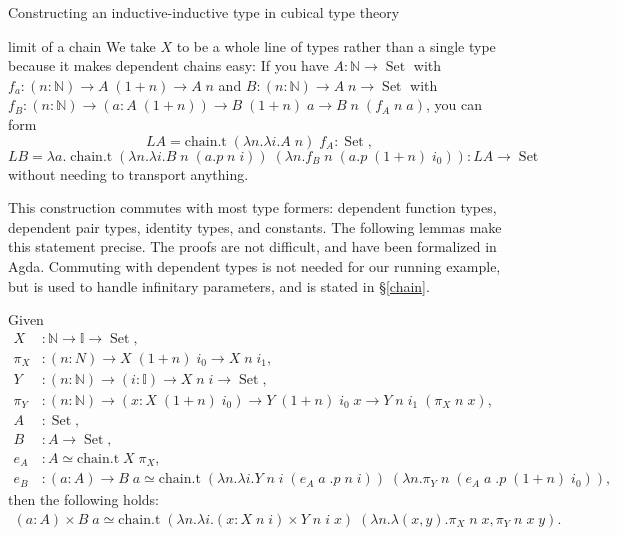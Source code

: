 \documentclass[acmsmall,review]{acmart}\settopmatter{printfolios=true,printccs=false,printacmref=false}
\DeclareMathOperator{\USet}{Set}
\newcommand{\N}{\mathbb{N}}
\newcommand{\I}{\mathbb{I}}
\begin{document}
\begin{section}{Constructing an inductive-inductive type in cubical type theory}
\begin{subsection}{limit of a chain}
We take $X$ to be a whole line of types rather than a single type because it makes dependent chains easy: If you have $A : \N\to \USet$ with $f_a : (n : \N) \to A\;(1+n) \to A\;n$ and $B : (n : \N) \to A\;n \to \USet$ with $f_B : (n : \N) \to (a : A\;(1+n)) \to B\;(1+n)\;a \to B\;n\;(f_A\;n\;a)$, you can form \[LA = \text{chain.t}\;(\lambda n.\lambda i. A\;n)\;f_A : \USet,\]\[LB = \lambda a.\;\text{chain.t}\;(\lambda n.\lambda i. B\;n\;(a.p\;n\;i))\;(\lambda n. f_B\;n\;(a.p\;(1+n)\;i_0)) : LA \to \USet\] without needing to transport anything.

This construction commutes with most type formers: dependent function types, dependent pair types, identity types, and constants. The following lemmas make this statement precise. The proofs are not difficult, and have been formalized in Agda. Commuting with dependent types is not needed for our running example, but is used to handle infinitary parameters, and is stated in \S\ref{chain}.

\begin{lemma}
    Given \begin{align*}
    X &: \N \to \I \to \USet,\\
    \pi_X &: (n : N) \to X\;(1+n)\;i_0 \to X\;n\;i_1,\\
    Y &: (n : \N) \to (i : \I) \to X\;n\;i \to \USet,\\
    \pi_Y &: (n : \N) \to (x : X\;(1+n)\;i_0) \to Y\;(1+n)\;i_0\;x \to Y\;n\;i_1\;(\pi_X\;n\;x),\\
    A &: \USet,\\
    B &: A \to \USet,\\
    e_A &: A \simeq \text{chain.t}\;X\;\pi_X,\\
    e_B &: (a : A) \to B\;a \simeq \text{chain.t}\;(\lambda n.\lambda i.Y\;n\;i\;(e_A\;a\;.p\;n\;i))\;(\lambda n.\pi_Y\;n\;(e_A\;a\;.p\;(1+n)\;i_0)),
    \end{align*}
    then the following holds:
    \begin{gather*}
    (a : A) \times B\;a \simeq \text{chain.t}\;(\lambda n. \lambda i. (x : X\;n\;i)\times Y\;n\;i\;x)\;(\lambda n.\lambda (x, y).\pi_X\;n\;x, \pi_Y\;n\;x\;y).
    \end{gather*}
\end{lemma}


\end{subsection}
\end{section}
\end{document}
